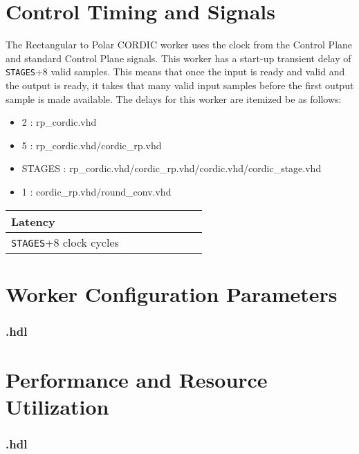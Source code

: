 \section*{Control Timing and Signals}
The Rectangular to Polar CORDIC worker uses the clock from the Control Plane and standard Control Plane signals. This worker has a start-up transient delay of \verb+STAGES++8 valid samples. This means that once the input is ready and valid and the output is ready, it takes that many valid input samples before the first output sample is made available. The delays for this worker are itemized be as follows:
\begin{itemize}
	\item 2 : rp\_cordic.vhd
	\item 5 : rp\_cordic.vhd/cordic\_rp.vhd
	\item STAGES : rp\_cordic.vhd/cordic\_rp.vhd/cordic.vhd/cordic\_stage.vhd 
	\item 1 : cordic\_rp.vhd/round\_conv.vhd
\end{itemize}

\begin{tabular}{|M{4.5cm}|M{1cm}|M{1cm}|M{1.5cm}|M{2cm}|M{1cm}|M{1cm}|M{2.5cm}|}
	\hline
	Latency                      \\
	\hline
	\verb+STAGES++8 clock cycles \\
	\hline
\end{tabular}

\begin{landscape}
\section*{Worker Configuration Parameters}
\subsubsection*{\comp.hdl}
%
\section*{Performance and Resource Utilization}
\subsubsection*{\comp.hdl}
%
\end{landscape}
